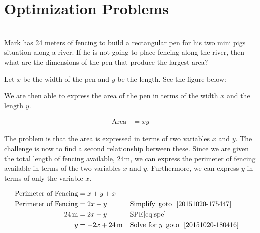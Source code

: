 \documentclass[20150903-160354-rs2.2-MarksMathNotebook.tex]{subfiles}
\begin{document}
%
%

\chapter{Optimization Problems}

\begin{example}[id:20151020-171605] \label{20151020-171605} \hfill \\
Mark has 24 meters of fencing to build a rectangular pen for his two mini pigs situation along a river.  If he is not going to place fencing along the river, then what are the dimensions of the pen that produce the largest area?

\soln

\solnsteps

Let $x$ be the width of the pen and $y$ be the length.  See the figure below:

\begin{center}
\end{center}

We are then able to express the area of the pen in terms of the width $x$ and the length $y$.

\begin{align*}
\text{Area} &= xy 
\end{align*}

The problem is that the area is expressed in terms of two variables $x$ and $y$.  The challenge is now to find a second relationship between these.  Since we are given the total length of fencing available, 24m, we can express the perimeter of fencing available in terms of the two variables $x$ and $y$. Furthermore, we can express $y$ in terms of only the variable $x$.

\begin{align*}
\text{Perimeter of Fencing} & = x + y + x \\
\text{Perimeter of Fencing} &= 2x + y && \text{Simplify} \text{\, goto \,} \, \ref{20151020-175447} \\
24 \, \mathrm{m} &= 2x + y && \text{SPE} \eqref{eq:spe} \\
y &=  -2x + 24 \, \mathrm{m} && \text{Solve for } y \text{\, goto \,} \, \ref{20151020-180416}
\end{align*} 


\end{example}
\end{document}
